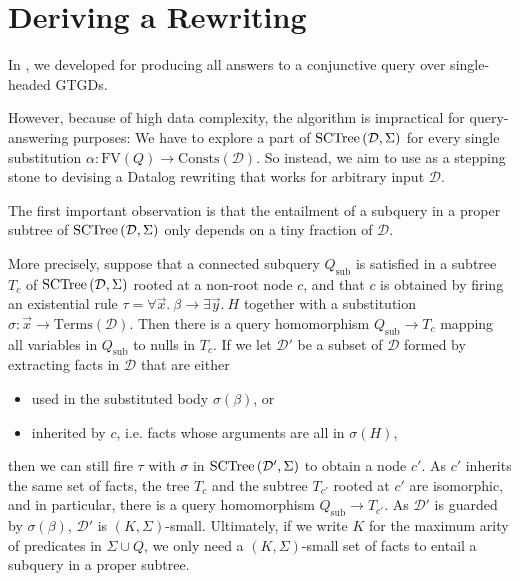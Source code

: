 \documentclass[12pt]{report}
\theoremstyle{plain}
\theoremstyle{definition}
\def\FV{{\mathrm{FV}}}
\def\Consts{{\mathrm{Consts}}}
\def\Terms{{\mathrm{Terms}}}
\newcommand{\SCTree}[2]{\ensuremath{\normalfont{\textrm{SCTree}} \left( #1, #2 \right)}}
\begin{document}
\newpage
\chapter{Deriving a Rewriting}\label{deriving-a-rewriting}

In , we developed  for producing all answers to a conjunctive query over single-headed GTGDs.

However, because of high data complexity, the algorithm is impractical for query-answering purposes: We have to explore a part of $\SCTree{\mathcal{D}}{\Sigma}$ for every single substitution $\alpha: \FV(Q) \rightarrow \Consts(\mathcal{D})$. So instead, we aim to use  as a stepping stone to devising a Datalog rewriting that works for arbitrary input $\mathcal{D}$.

The first important observation is that the entailment of a subquery in a proper subtree of $\SCTree{\mathcal{D}}{\Sigma}$ only depends on a tiny fraction of $\mathcal{D}$.

More precisely, suppose that a connected subquery $Q_\mathrm{sub}$ is satisfied in a subtree $T_c$ of $\SCTree{\mathcal{D}}{\Sigma}$ rooted at a non-root node $c$, and that $c$ is obtained by firing an existential rule $\tau = \forall \vec{x}.\ \beta \rightarrow \exists \vec{y}.\ H$ together with a substitution $\sigma: \vec{x} \rightarrow \Terms(\mathcal{D})$. Then there is a query homomorphism $Q_\mathrm{sub} \rightarrow T_c$ mapping all variables in $Q_\mathrm{sub}$ to nulls in $T_c$. If we let $\mathcal{D'}$ be a subset of $\mathcal{D}$ formed by extracting facts in $\mathcal{D}$ that are either
\begin{itemize}
  \item used in the substituted body $\sigma(\beta)$, or
  \item inherited by $c$, i.e. facts whose arguments are all in $\sigma(H)$,
\end{itemize}
then we can still fire $\tau$ with $\sigma$ in $\SCTree{\mathcal{D'}}{\Sigma}$ to obtain a node $c'$. As $c'$ inherits the same set of facts, the tree $T_c$ and the subtree $T_{c'}$ rooted at $c'$ are isomorphic, and in particular, there is a query homomorphism $Q_\mathrm{sub} \rightarrow T_{c'}$. As $\mathcal{D'}$ is guarded by $\sigma(\beta)$, $\mathcal{D'}$ is $(K, \Sigma)$-small. Ultimately, if we write $K$ for the maximum arity of predicates in $\Sigma \cup Q$, we only need a $(K, \Sigma)$-small set of facts to entail a subquery in a proper subtree.
\end{document}
